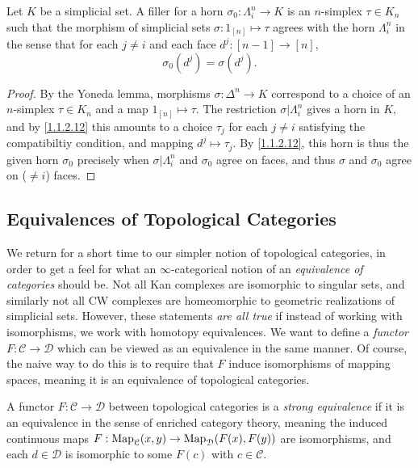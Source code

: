 \begin{corollary}\label{1.1.2.13}
	Let $K$ be a simplicial set. A filler for a	 horn $\sigma_0:\Lambda_i^n\to K$ is an $n$-simplex $\tau\in K_n$ such that the morphism of simplicial sets $\sigma:1_{[n]} \mapsto \tau$ agrees with the horn $\Lambda_i^n$ in the sense that for each $j\neq i$ and each face $d^j : [n-1] \to [n]$,
			\[
				\sigma_0(d^j)=\sigma(d^j)
			.\]	
\end{corollary}
\begin{proof}
	By the Yoneda lemma, morphisms $\sigma:\Delta^n \to K$ correspond to a choice of an $n$-simplex $\tau\in K_n$ and a map $1_{[n]} \mapsto \tau$. The restriction $\sigma|\Lambda_i^n$ gives a horn in $K$, and by \cref{1.1.2.12} this amounts to a choice $\tau_j$ for each $j\neq i$ satisfying the compatibiltiy condition, and mapping $d^j \mapsto \tau_j$. By \cref{1.1.2.12}, this horn is thus the given horn $\sigma_0$ precisely when $\sigma|\Lambda_i^n$ and $\sigma_0$ agree on faces, and thus $\sigma$ and $\sigma_0$ agree on ($\neq i$) faces.
\end{proof}



\subsection{Equivalences of Topological Categories}\label{sec1.1.3}

We return for a short time to our simpler notion of topological categories, in order to get a feel for what an $\infty $-categorical notion of an \emph{equivalence of categories} should be. Not all Kan complexes are isomorphic to singular sets, and similarly not all CW complexes are homeomorphic to geometric realizations of simplicial sets. However, these statements \emph{are all true} if instead of working with isomorphisms, we work with homotopy equivalences. We want to define a \emph{functor} $F : \mathcal{C}  \to \mathcal{D} $ which can be viewed as an equivalence in the same manner. Of course, the naive way to do this is to require that $F$ induce isomorphisms of mapping spaces, meaning it is an equivalence of topological categories.

\begin{definition}\label{1.1.3.1}
	A functor $F : \mathcal{C}  \to \mathcal{D} $ between topological categories is a \emph{strong equivalence} if it is an equivalence in the sense of enriched category theory, meaning the induced continuous maps $F : \operatorname{Map}_\mathcal{C}  (x,y) \to \operatorname{Map}_\mathcal{D}  (F(x),F(y))$ are isomorphisms, and each $d\in \mathcal{D} $ is isomorphic to some $F(c)$ with $c\in \mathcal{C} $.
\end{definition}

